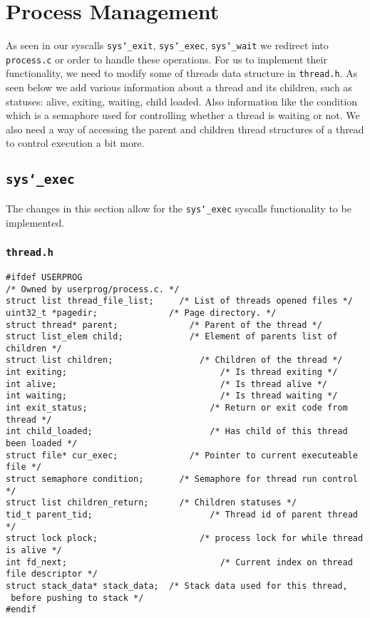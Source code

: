 \documentclass[]{article}
\begin{document}
		   
		   

\section{Process Management}
 As seen in our syscalls \texttt{sys\char`_exit}, \texttt{sys\char`_exec}, \texttt{sys\char`_wait} we redirect into \texttt{process.c} or order to handle these operations. For us to implement their functionality, we need to modify some of threads data structure in \texttt{thread.h}. As seen below we add various information about a thread and its children, such as statuses: alive, exiting, waiting, child loaded. Also information like the condition which is a semaphore used for controlling whether a thread is waiting or not. We also need a way of accessing the parent and children thread structures of a thread to control execution a bit more. 
 \subsection{\texttt{sys\char`_exec}}
 The changes in this section allow for the \texttt{sys\char`_exec} syscalls functionality to be implemented.
 \subsubsection{\texttt{thread.h}}
 			\lstset{language=C, tabsize=2}  
		    \begin{lstlisting}   
#ifdef USERPROG
/* Owned by userprog/process.c. */
struct list thread_file_list;	  /* List of threads opened files */      
uint32_t *pagedir;             	/* Page directory. */
struct thread* parent;		    	/* Parent of the thread */
struct list_elem child;			    /* Element of parents list of children */
struct list children;			      /* Children of the thread */
int exiting;					          /* Is thread exiting */
int alive;						          /* Is thread alive */
int waiting;					          /* Is thread waiting */
int exit_status;			    	    /* Return or exit code from thread */
int child_loaded;				        /* Has child of this thread been loaded */
struct file* cur_exec;			    /* Pointer to current executeable file */
struct semaphore condition;		  /* Semaphore for thread run control */
struct list children_return;	  /* Children statuses */
tid_t parent_tid;				        /* Thread id of parent thread */
struct lock plock;				      /* process lock for while thread is alive */
int fd_next;				         	  /* Current index on thread file descriptor */
struct stack_data* stack_data;  /* Stack data used for this thread,
 before pushing to stack */
#endif 

		   \end{lstlisting}	  
		   \newpage
\end{document}
